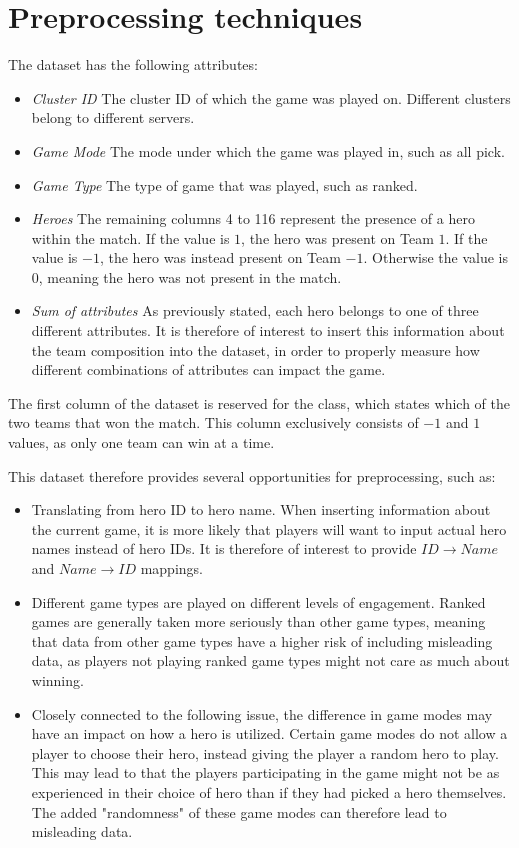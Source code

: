 \documentclass[a4paper, titlepage,12pt]{article}
\begin{document}
	\section{Preprocessing techniques}
		The dataset\cite{dataset} has the following attributes:
		\begin{itemize}
			\item \textit{Cluster ID} The cluster ID of which the game was played on. Different clusters belong to different servers.
			\item \textit{Game Mode} The mode under which the game was played in, such as all pick.
			\item \textit{Game Type} The type of game that was played, such as ranked.
			\item \textit{Heroes} The remaining columns 4 to 116 represent the presence of a hero within the match. If the value is $1$, the hero was present on Team $1$. If the value is $-1$, the hero was instead present on Team $-1$. Otherwise the value is $0$, meaning the hero was not present in the match.
			\item \textit{Sum of attributes} As previously stated, each hero belongs to one of three different attributes. It is therefore of interest to insert this information about the team composition into the dataset, in order to properly measure how different combinations of attributes can impact the game.
		\end{itemize}
		The first column of the dataset is reserved for the class, which states which of the two teams that won the match. This column exclusively consists of $-1$ and $1$ values, as only one team can win at a time.

		This dataset therefore provides several opportunities for preprocessing, such as:
		\begin{itemize}
			\item Translating from hero ID to hero name. When inserting information about the current game, it is more likely that players will want to input actual hero names instead of hero IDs. It is therefore of interest to provide $ID \rightarrow Name$ and $Name \rightarrow ID$ mappings\cite{mappings}.
				\item Different game types are played on different levels of engagement. Ranked games are generally taken more seriously than other game types, meaning that data from other game types have a higher risk of including misleading data, as players not playing ranked game types might not care as much about winning.
				\item Closely connected to the following issue, the difference in game modes may have an impact on how a hero is utilized. Certain game modes do not allow a player to choose their hero, instead giving the player a random hero to play. This may lead to that the players participating in the game might not be as experienced in their choice of hero than if they had picked a hero themselves. The added "randomness" of these game modes can therefore lead to misleading data.
		\end{itemize}
\end{document}
